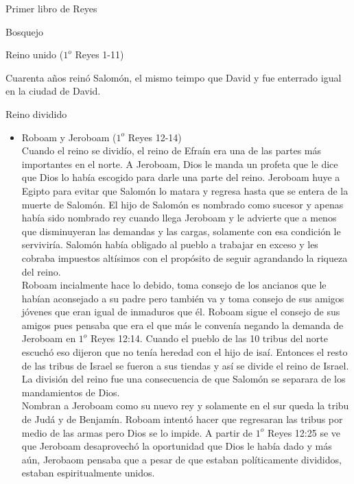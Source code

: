 \begin{section}{Primer libro de Reyes}
\begin{subsection}{Bosquejo}
\begin{subsubsection}{Reino unido ($1^{o}$ Reyes 1-11)}
\begin{enumerate}
	 Cuarenta años reinó Salomón, el mismo teimpo que David y fue enterrado igual en la ciudad de David.
			\end{enumerate}
		\end{subsubsection}
		\begin{subsubsection}{Reino dividido}
			\begin{itemize}
				\item Roboam y Jeroboam ($1^{o}$ Reyes 12-14)\\
					Cuando el reino se dividío, el reino de Efraín era una de las partes más importantes en el norte. A Jeroboam, Dios le manda un profeta que le dice que Dios lo había escogido para darle una parte del reino. Jeroboam huye a Egipto para evitar que Salomón lo matara y regresa hasta que se entera de la muerte de Salomón. El hijo de Salomón es nombrado como sucesor y apenas había sido nombrado rey cuando llega Jeroboam y le advierte que a menos que disminuyeran las demandas y las cargas, solamente con esa condición le serviviría. Salomón había obligado al pueblo a trabajar en exceso y les cobraba impuestos altísimos con el propósito de seguir agrandando la riqueza del reino.\\
					Roboam incialmente hace lo debido, toma consejo de los ancianos que le habían aconsejado a su padre pero también va y toma consejo de sus amigos jóvenes que eran igual de inmaduros que él. 
					\newpage
					Roboam sigue el consejo de sus amigos pues pensaba que era el que más le convenía negando la demanda de Jeroboam en $1^{o}$ Reyes 12:14. Cuando el pueblo de las 10 tribus del norte escuchó eso dijeron que no tenía heredad con el hijo de isaí. Entonces el resto de las tribus de Israel se fueron a sus tiendas y así se divide el reino de Israel. La división del reino fue una consecuencia de que Salomón se separara de los mandamientos de Dios.\\
					Nombran a Jeroboam como su nuevo rey y solamente en el sur queda la tribu de Judá y de Benjamín. Roboam intentó hacer que regresaran las tribus por medio de las armas pero Dios se lo impide. A partir de $1^{o}$ Reyes 12:25 se ve que Jeroboam desaprovechó la oportunidad que Dios le había dado y más aún, Jerobaom pensaba que a pesar de que estaban políticamente divididos, estaban espiritualmente unidos.\\ \\

\end{itemize}
\end{subsubsection}
\end{subsection}
\end{section}

